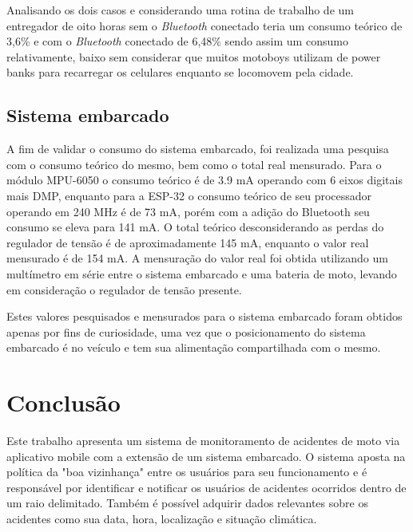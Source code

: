 Analisando os dois casos e considerando uma rotina de  trabalho de um entregador de oito horas sem o \textit{Bluetooth} conectado teria um consumo teórico de 3,6\% e com o \textit{Bluetooth} conectado de  6,48\% sendo assim  um consumo relativamente, baixo sem considerar que muitos motoboys utilizam de power banks para recarregar os celulares enquanto se locomovem pela cidade.









\subsection{\textbf{Sistema embarcado}}

A fim de validar o consumo do sistema embarcado, foi realizada uma pesquisa com o consumo teórico do mesmo, bem como o total real mensurado. Para o módulo MPU-6050 o consumo teórico é de 3.9 mA operando com 6 eixos digitais mais DMP, enquanto para a ESP-32 o consumo teórico de seu processador operando em 240 MHz é de 73 mA, porém com a adição do Bluetooth seu consumo se eleva para 141 mA. O total teórico desconsiderando as perdas do regulador de tensão é de aproximadamente 145 mA, enquanto o valor real mensurado é de 154 mA. A mensuração do valor real foi obtida utilizando um multímetro em série entre o sistema embarcado e uma bateria de moto, levando em consideração o regulador de tensão presente.

Estes valores pesquisados e mensurados para o sistema embarcado foram obtidos apenas por fins de curiosidade, uma vez que o posicionamento do sistema embarcado é no veículo e tem sua alimentação compartilhada com o mesmo.





\section{Conclusão}

Este trabalho apresenta um sistema de monitoramento de acidentes de moto via aplicativo mobile com a extensão de um sistema embarcado. O sistema aposta na política da "boa vizinhança" entre os usuários para seu funcionamento e é responsável por identificar e notificar os usuários de acidentes ocorridos dentro de um raio delimitado. Também é possível adquirir dados relevantes sobre os acidentes como sua data, hora, localização e situação climática.

